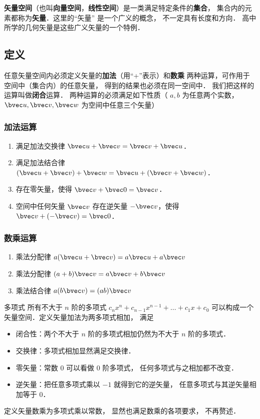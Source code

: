 

\textbf{矢量空间}（也叫\textbf{向量空间}，\textbf{线性空间}）是一类满足特定条件的\textbf{集合}， 集合内的元素都称为\textbf{矢量}．这里的“矢量” 是一个广义的概念， 不一定具有长度和方向． 高中所学的几何矢量是这些广义矢量的一个特例．

\subsection{定义}
任意矢量空间内必须定义矢量的\textbf{加法}（用“+”表示）和\textbf{数乘} 两种运算，可作用于空间中（集合内）的任意矢量， 得到的结果也必须在同一空间中． 我们把这样的运算叫做\textbf{闭合}运算． 两种运算的必须满足如下性质（ $a,b$ 为任意两个实数，$\bvec u,\bvec v,\bvec w$ 为空间中任意三个矢量）

\subsubsection{加法运算}
\begin{enumerate}
\item 满足加法交换律 $\bvec u + \bvec v = \bvec v + \bvec u$．
\item 满足加法结合律 $(\bvec u + \bvec v) + \bvec w = \bvec u + (\bvec v + \bvec w)$．
\item 存在零矢量，使得 $\bvec v + \bvec 0 = \bvec v$．
\item 空间中任何矢量 $\bvec v$ 存在逆矢量 $-\bvec v$，使得 $\bvec v + (-\bvec v) = \bvec 0$．
\end{enumerate}

\subsubsection{数乘运算}
\begin{enumerate}
\item 乘法分配律 $a(\bvec u + \bvec v) = a\bvec u + a\bvec v$ 
\item 乘法分配律 $(a + b)\bvec v = a\bvec v + b\bvec v$
\item 乘法结合律 $a (b \bvec v) = (ab) \bvec v$
\end{enumerate}

\begin{example}{多项式}\label{LSpace_ex1}
所有不大于 $n$ 阶的多项式 $c_n x^n + c_{n-1} x^{n-1} + \dots + c_1 x + c_0$ 可以构成一个矢量空间．定义矢量加法为两多项式相加， 满足
\begin{itemize}
\item 闭合性：两个不大于 $n$ 阶的多项式相加仍然为不大于 $n$ 阶的多项式．
\item 交换律：多项式相加显然满足交换律．
\item 零矢量：常数 0 可以看做 0 阶多项式， 任何多项式与之相加都不改变．
\item 逆矢量：把任意多项式乘以 $-1$ 就得到它的逆矢量， 任意多项式与其逆矢量相加等于 0．
\end{itemize}
定义矢量数乘为多项式乘以常数， 显然也满足数乘的各项要求， 不再赘述．
\end{example}


